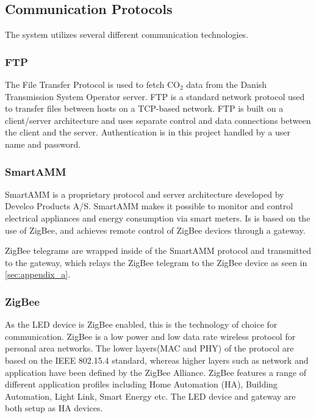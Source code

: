 \documentclass[Main]{subfiles}
\begin{document}
	\subsection{Communication Protocols}
		The system utilizes several different communication technologies.

		\subsubsection{FTP}
			The File Transfer Protocol is used to fetch CO$_2$ data from the Danish Transmission System Operator server.
			FTP is a standard network protocol used to transfer files between hosts on a TCP-based network\cite{FTPWikipedia:Online}.
			FTP is built on a client/server architecture and uses separate control and data connections between the client and the server\cite{TCPIPProtocol}.
			Authentication is in this project handled by a user name and password.  


		\subsubsection{SmartAMM}
			SmartAMM is a proprietary protocol and server architecture developed by Develco Products A/S. 
			SmartAMM makes it possible to monitor and control electrical appliances and energy consumption via smart meters.
			Is is based on the use of ZigBee, and achieves remote control of ZigBee devices through a gateway\cite{SmartAMM:Online}.

			ZigBee telegrams are wrapped inside of the SmartAMM protocol and transmitted to the gateway, which relays the ZigBee telegram to the ZigBee device as seen in \ref{sec:appendix_a}.


		\subsubsection{ZigBee}
			As the LED device is ZigBee enabled, this is the technology of choice for communication. 
			ZigBee is a low power and low data rate wireless protocol for personal area networks. 
			The lower layers(MAC and PHY) of the protocol are based on the IEEE 802.15.4 standard\cite{ZigBeeSpec}, whereas higher layers such as network and application have been defined by the ZigBee Alliance.
			ZigBee features a range of different application profiles including Home Automation (HA), Building Automation, Light Link, Smart Energy etc\cite{ZigBeeApplicationProfiles:Online}.
			The LED device and gateway are both setup as HA devices. 
\end{document}
